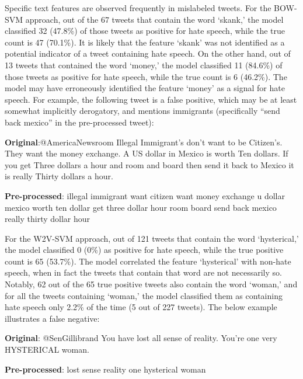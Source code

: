 \documentclass[11pt,a4paper]{article}
\begin{document}
Specific text features are observed frequently in mislabeled tweets. For the BOW-SVM approach, out of the 67 tweets that contain the word ‘skank,’ the model classified 32 (47.8\%) of those tweets as positive for hate speech, while the true count is 47 (70.1\%). It is likely that the feature ‘skank’ was not identified as a potential indicator of a tweet containing hate speech. On the other hand, out of 13 tweets that contained the word ‘money,’ the model classified 11 (84.6\%) of those tweets as positive for hate speech, while the true count is 6 (46.2\%). The model may have erroneously identified the feature ‘money’ as a signal for hate speech. For example, the following tweet is a false positive, which may be at least somewhat implicitly derogatory, and mentions immigrants (specifically “send back mexico” in the pre-processed tweet): 


\begin{displayquote}
    \textbf{Original}:@AmericaNewsroom Illegal Immigrant's don't want to be Citizen's. They want the money exchange. A US dollar in Mexico is worth Ten dollars. If you get Three dollars a hour and room and board then send it back to Mexico it is really Thirty dollars a hour.
\end{displayquote}

\begin{displayquote}
    \textbf{Pre-processed}: illegal immigrant want citizen want money exchange u dollar mexico worth ten dollar get three dollar hour room board send back mexico really thirty dollar hour
\end{displayquote}

For the W2V-SVM approach, out of 121 tweets that contain the word ‘hysterical,’ the model classified 0 (0\%) as positive for hate speech, while the true positive count is 65 (53.7\%). The model correlated the feature ‘hysterical’ with non-hate speech, when in fact the tweets that contain that word are not necessarily so. Notably, 62 out of the 65 true positive tweets also contain the word ‘woman,’ and for all the tweets containing ‘woman,’ the model classified them as containing hate speech only 2.2\% of the time (5 out of 227 tweets). The below example illustrates a false negative:

\begin{displayquote}
    \textbf{Original}: @SenGillibrand You have lost all sense of reality. You're one very HYSTERICAL woman.
\end{displayquote}

\begin{displayquote}
    \textbf{Pre-processed}: lost sense reality one hysterical woman
\end{displayquote}
\end{document}
